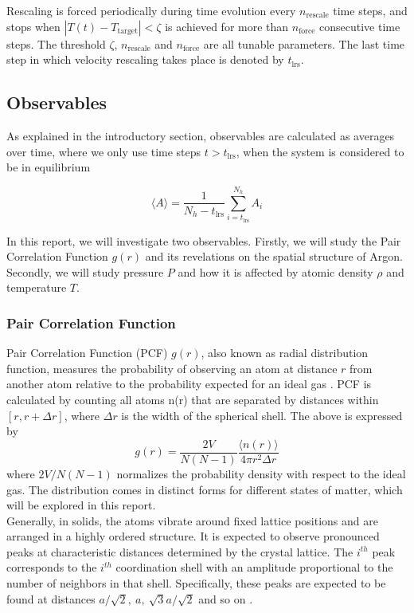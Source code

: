 \documentclass[twocolumn,10pt]{article}
\begin{document}
Rescaling is forced periodically during time evolution every $n_{\text{rescale}}$ time steps, and stops when $|T(t)-T_{\text{target}}| < \zeta$ is achieved for more than $n_{\text{force}}$ consecutive time steps. The threshold $\zeta$, $n_{\text{rescale}}$ and $n_{\text{force}}$ are all tunable parameters. The last time step in which velocity rescaling takes place is denoted by $t_{\text{lrs}}$.

\subsection{Observables}

As explained in the introductory section, observables are calculated as averages over time, where we only use time steps $t>t_{\text{lrs}}$, when the system is considered to be in equilibrium

\begin{equation}
    \langle A\rangle = \frac{1}{N_h-t_{\text{lrs}}}\sum_{i = t_{\text{lrs}}}^{N_h}A_i
    \label{time avg}
\end{equation}

In this report, we will investigate two observables. Firstly, we will study the Pair Correlation Function $g(r)$ and its revelations on the spatial structure of Argon. Secondly, we will study pressure $P$ and how it is affected by atomic density $\rho$ and temperature $T$.

\subsubsection{Pair Correlation Function}
 Pair Correlation Function (PCF) $g(r)$, also known as radial distribution function, measures the probability of observing an atom at distance $r$ from another atom relative to the probability expected for an ideal gas \cite{Rahman}. PCF is calculated by counting all atoms n(r) that are separated by distances within $[r,r+\Delta r]$, where $\Delta r$ is the width of the spherical shell. The above is expressed by
\begin{equation}
    g(r) = \frac{2V}{N(N-1)} \frac{\langle n(r) \rangle}{4 \pi r^2 \Delta r} 
    \label{g}
\end{equation}
where $2V/N(N-1)$ normalizes the probability density with respect to the ideal gas. The distribution comes in distinct forms for different states of matter, which will be explored in this report.\\
 
 Generally, in solids, the atoms vibrate around fixed lattice positions and are arranged in a highly ordered structure. It is expected to observe pronounced peaks at characteristic distances determined by the crystal lattice. The $i^{th}$ peak corresponds to the $i^{th}$ coordination shell with an amplitude proportional to the number of neighbors in that shell. Specifically, these peaks are expected to be found at distances $a/\sqrt{2}, \  a, \ \sqrt{3}a/\sqrt{2}$ and so on \cite{kittel}. \\
\end{document}
